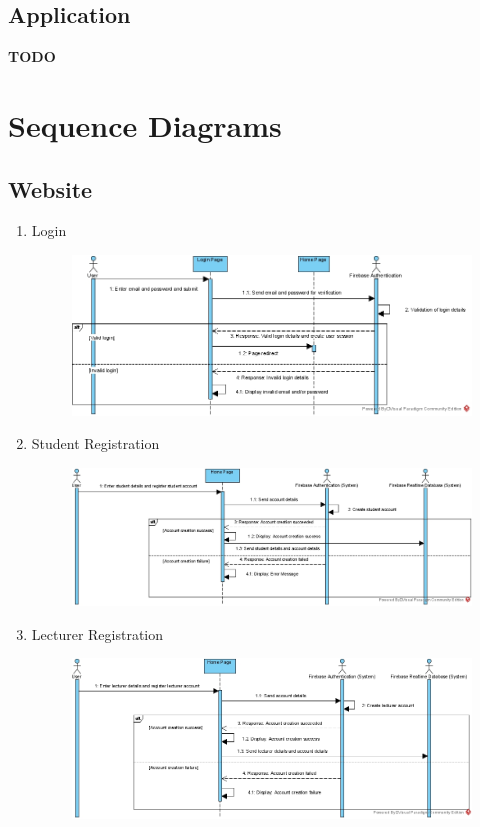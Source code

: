 \documentclass[../report.tex]{subfiles}
\begin{document}
\subsection{Application}
\textbf{TODO}
\section{Sequence Diagrams}
\subsection{Website}
\begin{enumerate}
\item Login\\
\begin{figure}[H]
\centering
\includegraphics[width=\textwidth]{./images/05-07-web-login.png}
\label{fig:web-login-seq}
\end{figure}
\item Student Registration\\
\begin{figure}[H]
\centering
\includegraphics[width=\textwidth]{./images/05-07-web-student-reg.png}
\label{fig:web-student-seq}
\end{figure}
\item Lecturer Registration\\
\begin{figure}[H]
\centering
\includegraphics[width=\textwidth]{./images/05-07-web-lec-reg.png}

\end{figure}
\end{enumerate}
\end{document}
